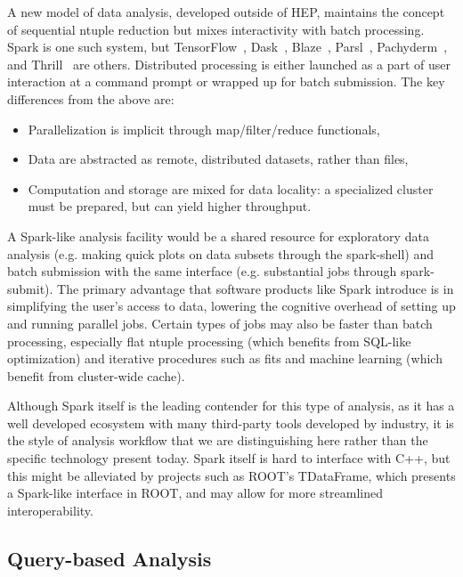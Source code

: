\documentclass[12pt,a4paper]{article}
\begin{document}
A new model of data analysis, developed outside of HEP, maintains the concept of sequential ntuple reduction but mixes interactivity with batch processing. Spark is one such system, but TensorFlow~\cite{abadi2016tensorflow}, Dask~\cite{rocklin2015dask}, Blaze~\cite{wiebe2014blaze}, Parsl~\cite{babuji_yadu_2017_853492}, Pachyderm~\cite{thepachydermteam}, and Thrill~\cite{bingmann2016thrill} are others. Distributed processing is either launched as a part of user interaction at a command prompt or wrapped up for batch submission. The key differences from the above are:
\begin{itemize}
\item Parallelization is implicit through map/filter/reduce functionals,
\item Data are abstracted as remote, distributed datasets, rather than files,
\item Computation and storage are mixed for data locality: a specialized cluster must be prepared, but can yield higher throughput.
\end{itemize}

A Spark-like analysis facility would be a shared resource for exploratory data analysis (e.g. making quick plots on data subsets through the spark-shell) and batch submission with the same interface (e.g. substantial jobs through spark-submit). The primary advantage that software products like Spark introduce is in simplifying the user's access to data, lowering the cognitive overhead of setting up and running parallel jobs. Certain types of jobs may also be faster than batch processing, especially flat ntuple processing (which benefits from SQL-like optimization) and iterative procedures such as fits and machine learning (which benefit from cluster-wide cache).

Although Spark itself is the leading contender for this type of analysis, as it has a well developed ecosystem with many third-party tools developed by industry, it is the style of analysis workflow that we are distinguishing here rather than the specific technology present today. Spark itself is hard to interface with C++, but this might be alleviated by projects such as ROOT's TDataFrame, which presents a Spark-like interface in ROOT, and may allow for more streamlined interoperability.

\subsection{Query-based Analysis}
\end{document}
